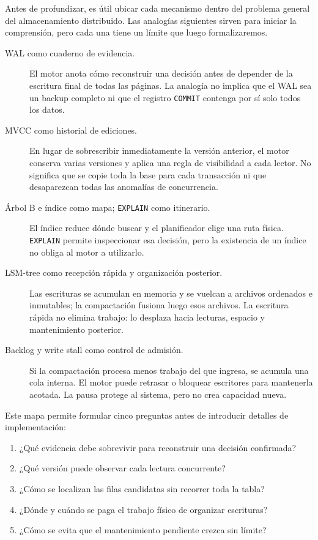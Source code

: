 \documentclass[variant=apuntes,cover=institutional,mode=screen]{ua-engineering-v6-article}
\begin{document}
Antes de profundizar, es útil ubicar cada mecanismo dentro del problema general del almacenamiento distribuido. Las analogías siguientes sirven para iniciar la comprensión, pero cada una tiene un límite que luego formalizaremos.

\begin{description}
\item[WAL como cuaderno de evidencia.] El motor anota cómo reconstruir una decisión antes de depender de la escritura final de todas las páginas. La analogía no implica que el WAL sea un backup completo ni que el registro \texttt{COMMIT} contenga por sí solo todos los datos.

\item[MVCC como historial de ediciones.] En lugar de sobrescribir inmediatamente la versión anterior, el motor conserva varias versiones y aplica una regla de visibilidad a cada lector. No significa que se copie toda la base para cada transacción ni que desaparezcan todas las anomalías de concurrencia.

\item[Árbol B e índice como mapa; \texttt{EXPLAIN} como itinerario.] El índice reduce dónde buscar y el planificador elige una ruta física. \texttt{EXPLAIN} permite inspeccionar esa decisión, pero la existencia de un índice no obliga al motor a utilizarlo.

\item[LSM-tree como recepción rápida y organización posterior.] Las escrituras se acumulan en memoria y se vuelcan a archivos ordenados e inmutables; la compactación fusiona luego esos archivos. La escritura rápida no elimina trabajo: lo desplaza hacia lecturas, espacio y mantenimiento posterior.

\item[Backlog y write stall como control de admisión.] Si la compactación procesa menos trabajo del que ingresa, se acumula una cola interna. El motor puede retrasar o bloquear escritores para mantenerla acotada. La pausa protege al sistema, pero no crea capacidad nueva.
\end{description}

Este mapa permite formular cinco preguntas antes de introducir detalles de implementación:

\begin{enumerate}
\item ¿Qué evidencia debe sobrevivir para reconstruir una decisión confirmada?
\item ¿Qué versión puede observar cada lectura concurrente?
\item ¿Cómo se localizan las filas candidatas sin recorrer toda la tabla?
\item ¿Dónde y cuándo se paga el trabajo físico de organizar escrituras?
\item ¿Cómo se evita que el mantenimiento pendiente crezca sin límite?
\end{enumerate}
\end{document}
